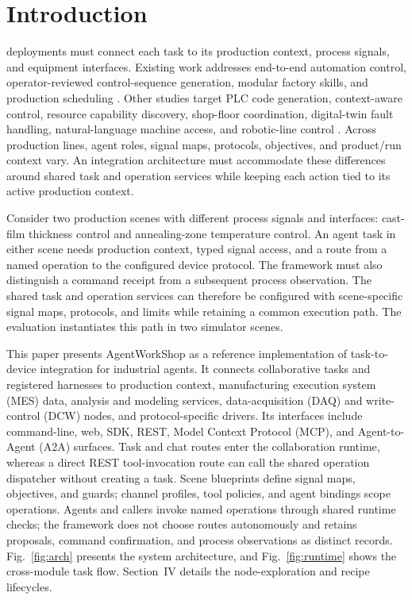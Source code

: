 \section{Introduction}
 deployments must connect each task to its
production context, process signals, and equipment interfaces. Existing work
addresses end-to-end automation control, operator-reviewed control-sequence
generation, modular factory skills, and production scheduling
\cite{xia2025control,huang2026made,koehle2026llmdriven,waseem2026pretrained}.
Other studies target PLC code generation, context-aware control, resource
capability discovery, shop-floor coordination, digital-twin fault handling,
natural-language machine access, and robotic-line control
\cite{liu2026agents4plc,wu2025instructmpc,lim2025llmenabled,zhao2026shopfloor,gill2025llmdt,hofmann2025nlc}.
Across production lines, agent roles, signal maps, protocols, objectives, and
product/run context vary. An integration architecture must accommodate these
differences around shared task and operation services while keeping each
action tied to its active production context.

Consider two production scenes with different process signals and interfaces:
cast-film thickness control and annealing-zone temperature control. An agent
task in either scene needs production context, typed signal access, and a
route from a named operation to the configured device protocol. The framework
must also distinguish a command receipt from a subsequent process
observation. The shared task and operation services can therefore be
configured with scene-specific signal maps, protocols, and limits while
retaining a common execution path. The evaluation instantiates this path in
two simulator scenes.

This paper presents AgentWorkShop as a reference implementation of
task-to-device integration for industrial agents. It connects collaborative tasks
and registered harnesses to production context, manufacturing execution
system (MES) data, analysis and modeling services, data-acquisition (DAQ) and
write-control (DCW) nodes, and protocol-specific drivers. Its interfaces include
command-line, web, SDK, REST, Model Context Protocol (MCP), and Agent-to-Agent
(A2A) surfaces. Task and chat routes enter the
collaboration runtime, whereas a direct REST tool-invocation route can call
the shared operation dispatcher without creating a task.
Scene blueprints define signal maps, objectives, and guards; channel profiles,
tool policies, and agent bindings scope operations. Agents and callers invoke
named operations through shared runtime checks; the framework does not choose
routes autonomously and retains proposals, command confirmation, and process
observations as distinct records. Fig.~\ref{fig:arch} presents the system
architecture, and Fig.~\ref{fig:runtime} shows the cross-module task flow.
Section~IV details the node-exploration and recipe lifecycles.

